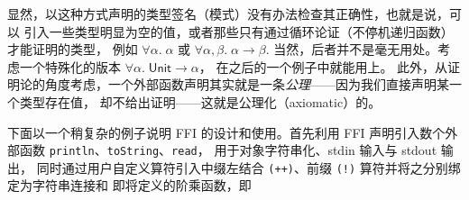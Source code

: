   显然，以这种方式声明的类型签名（模式）没有办法检查其正确性，也就是说，可以
  引入一些类型明显为空的值，或者那些只有通过循环论证（不停机递归函数）才能证明的类型，
  例如 $\forall\alpha.\;\alpha$ 或 $\forall\alpha,\beta.\;\alpha\to\beta$.
  当然，后者并不是毫无用处。考虑一个特殊化的版本 $\forall\alpha.\;\mathsf{Unit}\to\alpha$，
  在之后的一个例子中就能用上。
  此外，从证明论的角度考虑，一个外部函数声明其实就是一条\emph{公理}——因为我们直接声明某一个类型存在值，
  却不给出证明——这就是公理化（axiomatic）的。

  下面以一个稍复杂的例子说明 FFI 的设计和使用。首先利用 FFI 声明引入数个外部函数 \texttt{println}、\texttt{toString}、\texttt{read}，
  用于对象字符串化、stdin 输入与 stdout 输出，
  同时通过用户自定义算符引入中缀左结合 \texttt{(++)}、前缀 \texttt{(!)} 算符并将之分别绑定为字符串连接和
  即将定义的阶乘函数，即

